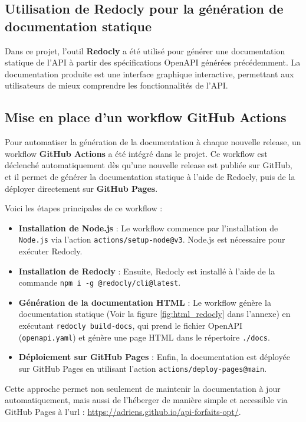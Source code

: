 \documentclass[11pt]{article}
\begin{document}
		\subsection{Utilisation de Redocly pour la génération de documentation statique}
		\label{subsec:redocly}
		
		Dans ce projet, l'outil \textbf{Redocly} a été utilisé pour générer une documentation statique de l'API à partir des spécifications OpenAPI générées précédemment. La documentation produite est une interface graphique interactive, permettant aux utilisateurs de mieux comprendre les fonctionnalités de l'API.
		
		\subsection{Mise en place d'un workflow GitHub Actions}
		
		Pour automatiser la génération de la documentation à chaque nouvelle release, un workflow \textbf{GitHub Actions} a été intégré dans le projet. Ce workflow est déclenché automatiquement dès qu'une nouvelle release est publiée sur GitHub, et il permet de générer la documentation statique à l'aide de Redocly, puis de la déployer directement sur \textbf{GitHub Pages}.
		
		Voici les étapes principales de ce workflow :
		\begin{itemize}
			\item \textbf{Installation de Node.js} : Le workflow commence par l'installation de \texttt{Node.js} via l'action \texttt{actions/setup-node@v3}. Node.js est nécessaire pour exécuter Redocly.
			\item \textbf{Installation de Redocly} : Ensuite, Redocly est installé à l'aide de la commande \texttt{npm i -g @redocly/cli@latest}.
			\item \textbf{Génération de la documentation HTML} : Le workflow génère la documentation statique (Voir la figure \ref{fig:html_redocly} dans l'annexe) en exécutant \texttt{redocly build-docs}, qui prend le fichier OpenAPI (\texttt{openapi.yaml}) et génère une page HTML dans le répertoire \texttt{./docs}.
			\item \textbf{Déploiement sur GitHub Pages} : Enfin, la documentation est déployée sur GitHub Pages en utilisant l'action \texttt{actions/deploy-pages@main}.
		\end{itemize}
		
		Cette approche permet non seulement de maintenir la documentation à jour automatiquement, mais aussi de l'héberger de manière simple et accessible via GitHub Pages à l'url : \url{https://adriens.github.io/api-forfaits-opt/}.
		
\end{document}
